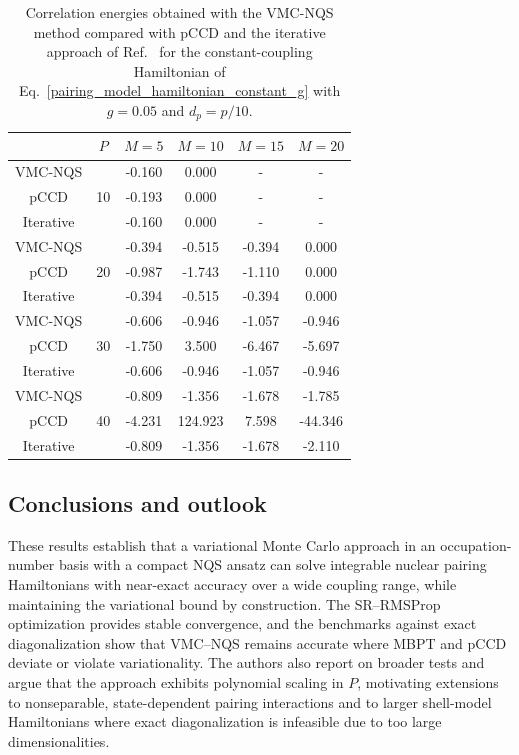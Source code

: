 \begin{table}[b]
\begin{center}
\vspace{0.5cm}
\begin{tabular}{ c | c | c c c c }
\hline
\hline
& $P$ & $M=5$  & $M=10$ & $M=15$ & $M=20$ \\
\hline
VMC-NQS & \multirow{3}{*}{ 10 }  & -0.160 & 0.000 & - & - \\
pCCD &  & -0.193 & 0.000 & - &  -\\
Iterative &  & -0.160  & 0.000 & - & - \\
\hline
VMC-NQS & \multirow{3}{*}{ 20 }  & -0.394 & -0.515 & -0.394 & 0.000 \\
pCCD &   & -0.987 & -1.743 & -1.110 &  0.000 \\
Iterative &   & -0.394 & -0.515 & -0.394 &  0.000 \\
\hline
VMC-NQS & \multirow{3}{*}{ 30 }  & -0.606 & -0.946 & -1.057 & -0.946 \\
pCCD &   & -1.750 & 3.500 & -6.467 &  -5.697\\
Iterative &   & -0.606 & -0.946 & -1.057 & -0.946\\
\hline
VMC-NQS & \multirow{3}{*}{ 40 }  & -0.809 & -1.356 & -1.678 & -1.785 \\
pCCD &   & -4.231 & 124.923 & 7.598 &  -44.346 \\
Iterative &   & -0.809 & -1.356 & -1.678 & -2.110\\
\hline
\end{tabular}
\caption{Correlation energies obtained with the VMC-NQS method compared with pCCD and the iterative approach of Ref.~\cite{Guan:2022CoPhC} for the constant-coupling Hamiltonian of Eq.~\eqref{pairing_model_hamiltonian_constant_g} with $g = 0.05$ and $d_p=p/10$.}
\label{tab:g_constant_large}
\end{center}
\end{table}


\subsection{Conclusions and outlook}

These results establish that a variational Monte Carlo approach  in an occupation-number basis with a
compact NQS ansatz can solve integrable nuclear pairing Hamiltonians
with near-exact accuracy over a wide coupling range, while maintaining
the variational bound by construction. The SR--RMSProp optimization
provides stable convergence, and the benchmarks against exact
diagonalization show that VMC--NQS remains accurate where MBPT and
pCCD deviate or violate variationality. The authors also report on
broader tests and argue that the approach exhibits polynomial scaling
in $P$, motivating extensions to nonseparable, state-dependent pairing
interactions and to larger shell-model Hamiltonians where exact
diagonalization is infeasible due to too large dimensionalities.




